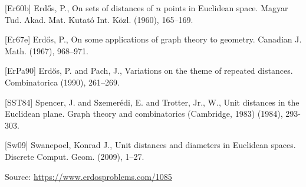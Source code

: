 \documentclass{article}
\begin{document}
 [Er60b] Erd\H{o}s, P., On sets of distances of {$n$} points in {E}uclidean space. Magyar Tud. Akad. Mat. Kutat\'o{} Int. K\"ozl. (1960), 165--169.
 
 [Er67e] Erd\H{o}s, P., On some applications of graph theory to geometry. Canadian J. Math. (1967), 968--971.
 
 [ErPa90] Erd\H{o}s, P. and Pach, J., Variations on the theme of repeated distances. Combinatorica (1990), 261--269.
 
 [SST84] Spencer, J. and Szemer\'{e}di, E. and Trotter, Jr., W., Unit distances in the Euclidean plane. Graph theory and combinatorics (Cambridge, 1983) (1984), 293-303.
 
 [Sw09] Swanepoel, Konrad J., Unit distances and diameters in {E}uclidean spaces. Discrete Comput. Geom. (2009), 1--27.

\bigskip
\noindent\small{Source: \url{https://www.erdosproblems.com/1085}}
\end{document}
